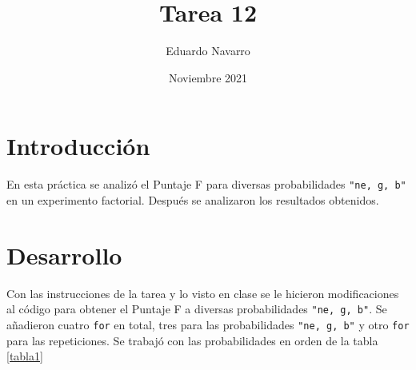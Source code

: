 \documentclass{article}
\title{Tarea 12}
\author{Eduardo Navarro}
\date{Noviembre 2021}
\begin{document}
\maketitle

\section{Introducción}

En esta práctica se analizó el Puntaje F \cite{fscore} para diversas probabilidades \texttt{"ne, g, b"} en un experimento factorial. Después se analizaron los resultados obtenidos.

\section{Desarrollo}
Con las instrucciones de la tarea \cite{redneuro} y lo visto en clase \cite{twitchsimu} se le hicieron modificaciones al código para obtener el Puntaje F \cite{fscore} a diversas probabilidades \texttt{"ne, g, b"}. Se añadieron cuatro \texttt{for} en total, tres para las probabilidades \texttt{"ne, g, b"} y otro \texttt{for} para las repeticiones. Se trabajó con las probabilidades en orden de la tabla \ref{tabla1}
\end{document}
